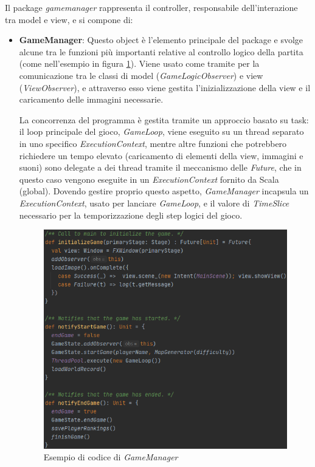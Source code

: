 Il package \textit{gamemanager} rappresenta il controller, responsabile dell'interazione tra model e view, e si compone di:

\begin{itemize}
    \item \textbf{GameManager}: Questo object è l'elemento principale del package e svolge alcune tra le funzioni più importanti relative al controllo logico della partita (come nell'esempio in figura \ref{gameManagerCode}). Viene usato come tramite per la comunicazione tra le classi di model (\textit{GameLogicObserver}) e view (\textit{ViewObserver}), e attraverso esso viene gestita l'inizializzazione della view e il caricamento delle immagini necessarie.
    
    La concorrenza del programma è gestita tramite un approccio basato su task: il loop principale del gioco, \textit{GameLoop}, viene eseguito su un thread separato in uno specifico \textit{ExecutionContext}, mentre altre funzioni che potrebbero richiedere un tempo elevato (caricamento di elementi della view, immagini e suoni) sono delegate a dei thread tramite il meccanismo delle \textit{Future}, che in questo caso vengono eseguite in un \textit{ExecutionContext} fornito da Scala (global). Dovendo gestire proprio questo aspetto, \textit{GameManager} incapsula un \textit{ExecutionContext}, usato per lanciare \textit{GameLoop}, e il valore di \textit{TimeSlice} necessario per la temporizzazione degli step logici del gioco.
    
    \begin{figure}[H]
      \includegraphics[width=15cm]{res/gameManagerCode.png}
      \caption{Esempio di codice di \textit{GameManager}}
      \label{gameManagerCode}
    \end{figure}


\end{itemize}
